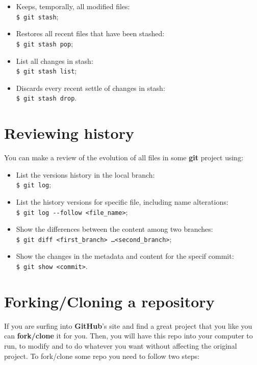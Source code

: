 \documentclass[12pt,a4paper,titlepage,brazil]{article}
\begin{document}
{\begin{itemize}
 \item Keeps, temporally, all modified files:\\
   \texttt{\$ git stash};
 \item Restores all recent files that have been stashed:\\
   \texttt{\$ git stash pop};
 \item List all changes in stash:\\
   \texttt{\$ git stash list};
 \item Discards every recent settle of changes in stash:\\
   \texttt{\$ git stash drop}.
\end{itemize}  


\section{Reviewing history}

You can make a review of the evolution of all files in some {\bf git} project using:

\begin{itemize}
 \item List the versions history in the local branch:\\
   \texttt{\$ git log};
 \item List the history versions for specific file, including name alterations:\\
   \texttt{\$ git log -\hspace{0.01cm}-follow <file\_name>};
 \item Show the differences between the content among two branches:\\
   \texttt{\$ git diff <first\_branch> \dots <second\_branch>};
 \item Show the changes in the metadata and content for the specif commit:\\
   \texttt{\$ git show <commit>}.
\end{itemize}  



\section{Forking/Cloning a repository}

If you are surfing into {\bf GitHub}'s site and find a great project that you like you can {\bf fork/clone} it for you. Then, you will have this repo into your computer to run, to modify and to do whatever you want without affecting the original project. To fork/clone some repo you need to follow two steps:

}
\end{document}
